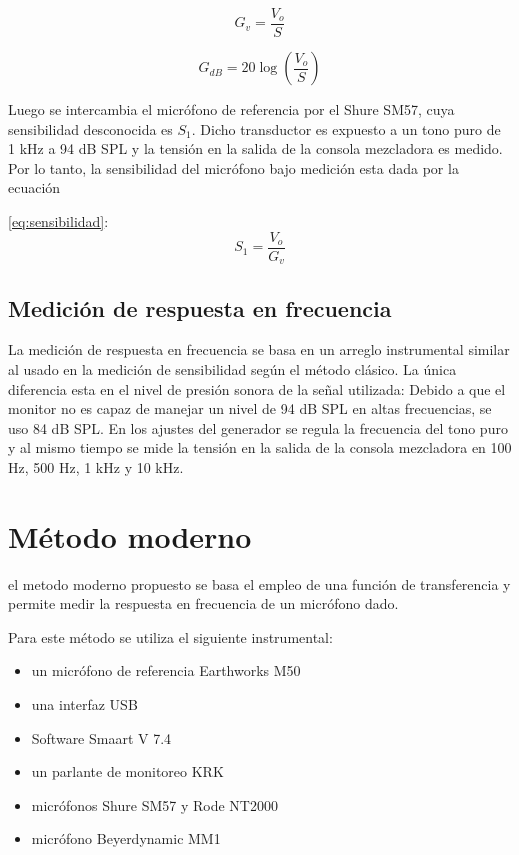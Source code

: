 \documentclass[]{article}
\begin{document}
\begin{multicols}{2}
\begin{equation}
  G_v=\frac{V_o}{S}
  \label{eq:g-veces}
\end{equation}

\begin{equation}
  G_{dB}= 20 \log \left(\frac{V_o}{S}\right)
  \label{eq:g-dB}
\end{equation}

Luego se intercambia el micrófono de referencia por el Shure SM57, cuya
sensibilidad desconocida es $S_1$. Dicho transductor es expuesto a un tono puro
de 1 kHz a 94 dB SPL y la tensión en la salida de la consola mezcladora es medido.
Por lo tanto, la sensibilidad del micrófono bajo medición esta dada por la ecuación

\ref{eq:sensibilidad}:
\begin{equation}
  S_1=\frac{V_o}{G_v}
  \label{eq:sensibilidad}
\end{equation}

\subsection{Medición de respuesta en frecuencia}
La medición de respuesta en frecuencia se basa en un arreglo instrumental
similar al usado en la medición de sensibilidad según el método clásico.
La única diferencia esta en el nivel de presión sonora de la señal utilizada: Debido
a que el monitor no es capaz de manejar un nivel de 94 dB SPL en altas
frecuencias, se uso 84 dB SPL.
En los ajustes del generador se regula la frecuencia del tono puro y al mismo
tiempo se mide la tensión en la salida de la consola mezcladora en 100 Hz, 500 Hz,
1 kHz y 10 kHz.

\section{Método moderno}
el metodo moderno propuesto se basa el empleo de una función de transferencia
\cite{smaart} y permite medir la respuesta en frecuencia de un micrófono dado.

Para este método se utiliza el siguiente instrumental:

\begin{itemize}
\item un micrófono de referencia Earthworks M50
\item una interfaz USB
\item Software Smaart V 7.4
\item un parlante de monitoreo KRK
\item micrófonos Shure SM57 y Rode NT2000
\item micrófono Beyerdynamic MM1
\end{itemize}


\end{multicols}
\end{document}
